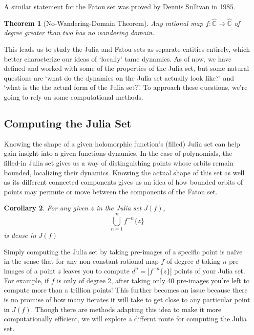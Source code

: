 \documentclass{amsart}
\newcommand{\bbC}{\mathbb{C}}
\newcommand{\bbCS}{\hat{\bbC}}
\newcommand{\abs}[1]{ \left| #1 \right| }
\newtheorem{thm}{Theorem}[section]
\newtheorem{cor}[thm]{Corollary}
\theoremstyle{definition}
\theoremstyle{remark}
\numberwithin{equation}{section}
\begin{document}
A similar statement for the Fatou set was proved by Dennis Sullivan in 1985.
\begin{thm}[No-Wandering-Domain Theorem]\cite{sullivan1985quasiconformal}\label{NWDT}
  Any rational map $f\colon\bbCS\to\bbCS$ of degree greater than two has no wandering domain.
\end{thm}

This leads us to study the Julia and Fatou sets as separate entities entirely, which better characterize our ideas of `locally' tame dynamics. As of now, we have defined and worked with some of the properties of the Julia set, but some natural questions are `what do the dynamics on the Julia set actually look like?' and `what is the the actual form of the Julia set?'. To approach these questions, we're going to rely on some computational methods.

  \subsection{Computing the Julia Set}\label{JuliaComp}

Knowing the shape of a given holomorphic function's (filled) Julia set can help gain insight into a given functions dynamics. In the case of polynomials, the filled-in Julia set gives us a way of distinguishing points whose orbits remain bounded, localizing their dynamics. Knowing the actual shape of this set as well as its different connected components gives us an idea of how bounded orbits of points may permute or move between the components of the Fatou set.

\begin{cor}\cite[Corollary 4.13]{milnor2011}
For any given $z$ in the Julia set $J(f)$,
\[
\bigcup_{n=1}^{\infty}f^{-n}\{z\}
\]is dense in $J(f)$
\end{cor}

Simply computing the Julia set by taking pre-images of a specific point is na\"ive in the sense that for any non-constant rational map $f$ of degree $d$ taking $n$ pre-images of a point $z$ leaves you to compute $d^n=\abs{f^{-n}\{z\}}$ points of your Julia set. For example, if $f$ is only of degree 2, after taking only 40 pre-images you're left to compute more than a trillion points! This further becomes an issue because there is no promise of how many iterates it will take to get close to any particular point in $J(f)$. Though there are methods adapting this idea to make it more computationally efficient, we will explore a differnt route for computing the Julia set.
\end{document}
